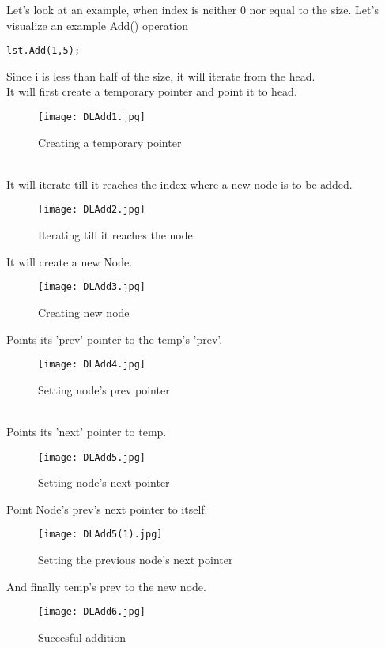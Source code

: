 \documentclass[11pt,fleqn]{book} %
\begin{document}
\begin{example}
Let's look at an example, when index is neither 0 nor equal to the size.
Let's visualize an example Add() operation\\
\begin{lstlisting}
lst.Add(1,5);
\end{lstlisting}
Since i is less than half of the size, it will iterate from the head.\\
It will first create a temporary pointer and point it to head.
\begin{figure}[H]
	\centering
	\texttt{[image: DLAdd1.jpg]}
	\caption{Creating a temporary pointer}
\end{figure} ~\\
It will iterate till it reaches the index where a new node is to be added.
\begin{figure}[H]
	\centering
	\texttt{[image: DLAdd2.jpg]}
	\caption{Iterating till it reaches the node}
\end{figure}
It will create a new Node.
\begin{figure}[H]
	\centering
	\texttt{[image: DLAdd3.jpg]}
	\caption{Creating new node}
\end{figure}
Points its 'prev' pointer to the temp's 'prev'.
\begin{figure}[H]
	\centering
	\texttt{[image: DLAdd4.jpg]}
	\caption{Setting node's prev pointer}
\end{figure}~\\
Points its 'next' pointer to temp.
\begin{figure}[H]
	\centering
	\texttt{[image: DLAdd5.jpg]}
	\caption{Setting node's next pointer}
\end{figure}
Point Node's prev's next pointer to itself.
\begin{figure}[H]
	\centering
	\texttt{[image: DLAdd5(1).jpg]}
	\caption{Setting the previous node's next pointer}
\end{figure}
And finally temp's prev to the new node.
\begin{figure}[H]
	\centering
	\texttt{[image: DLAdd6.jpg]}
	\caption{Succesful addition}
\end{figure}
\end{example}
\end{document}
